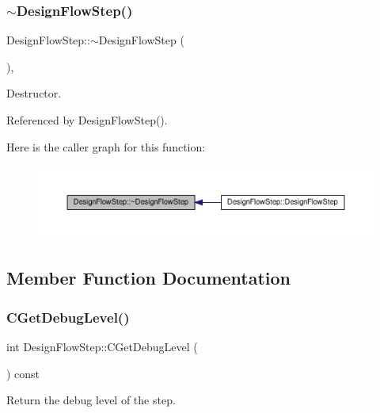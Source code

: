 \subsubsection{\texorpdfstring{$\sim$\+Design\+Flow\+Step()}{~DesignFlowStep()}}
{\footnotesize\ttfamily Design\+Flow\+Step\+::$\sim$\+Design\+Flow\+Step (\begin{DoxyParamCaption}{ }\end{DoxyParamCaption})\hspace{0.3cm}{\ttfamily [virtual]}, {\ttfamily [default]}}



Destructor. 



Referenced by Design\+Flow\+Step().

Here is the caller graph for this function\+:
\nopagebreak
\begin{figure}[H]
\begin{center}
\leavevmode
\includegraphics[width=350pt]{d3/da9/classDesignFlowStep_a1145a27e25a0afbe24eed50403ca0e6a_icgraph}
\end{center}
\end{figure}


\subsection{Member Function Documentation}
\mbox{\label{classDesignFlowStep_a3b33b8a51e6b58238a8377d077523b88}} 
\subsubsection{\texorpdfstring{C\+Get\+Debug\+Level()}{CGetDebugLevel()}}
{\footnotesize\ttfamily int Design\+Flow\+Step\+::\+C\+Get\+Debug\+Level (\begin{DoxyParamCaption}{ }\end{DoxyParamCaption}) const}



Return the debug level of the step. 

